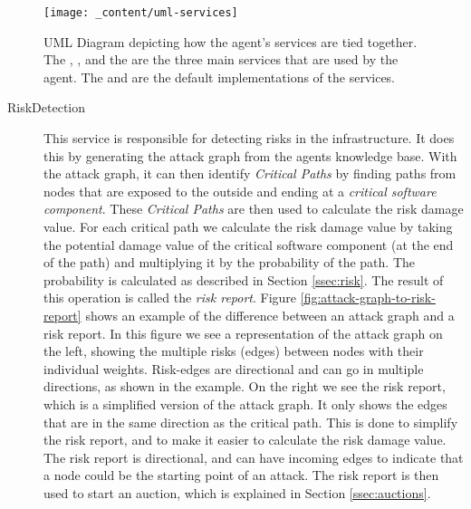 \begin{figure}[H]
    \centering
    \texttt{[image: \_content/uml-services]}
    \caption{UML Diagram depicting how the agent's services are tied together. The , , and the  are the three main services that are used by the agent. The  and  are the default implementations of the services.}
    \label{fig:uml-services}
\end{figure}

\begin{description}
    \item[RiskDetection] This service is responsible for detecting risks in the infrastructure. It does this by generating the attack graph from the agents knowledge base. With the attack graph, it can then identify \textit{Critical Paths} by finding paths from nodes that are exposed to the outside and ending at a \textit{critical software component}. These \textit{Critical Paths} are then used to calculate the risk damage value. For each critical path we calculate the risk damage value by taking the potential damage value of the critical software component (at the end of the path) and multiplying it by the probability of the path. The probability is calculated as described in Section \ref{ssec:risk}. The result of this operation is called the \emph{risk report}. Figure \ref{fig:attack-graph-to-risk-report} shows an example of the difference between an attack graph and a risk report. In this figure we see a representation of the attack graph on the left, showing the multiple risks (edges) between nodes with their individual weights. Risk-edges are directional and can go in multiple directions, as shown in the example. On the right we see the risk report, which is a simplified version of the attack graph. It only shows the edges that are in the same direction as the critical path. This is done to simplify the risk report, and to make it easier to calculate the risk damage value. The risk report is directional, and can have incoming edges to indicate that a node could be the starting point of an attack. The risk report is then used to start an auction, which is explained in Section \ref{ssec:auctions}.
    

\end{description}
